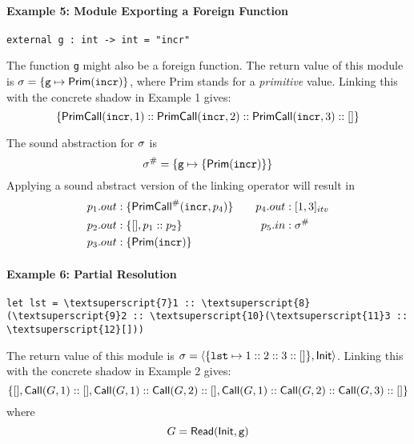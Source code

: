\documentclass{article}
\begin{document}
\paragraph{Example 5: Module Exporting a Foreign Function}
\begin{center}
  \begin{BVerbatim}
external g : int -> int = "incr"
  \end{BVerbatim}
\end{center}
The function \texttt{g} might also be a foreign function.
The return value of this module is
$\sigma=\{\texttt{g}\mapsto\textsf{Prim}(\texttt{incr})\}$,
where \textsf{Prim} stands for a \emph{primitive} value.
Linking this with the concrete shadow in Example 1 gives:
\[\{\textsf{PrimCall}(\texttt{incr},1)::\textsf{PrimCall}(\texttt{incr},2)::\textsf{PrimCall}(\texttt{incr},3)::[]\}\]

The sound abstraction for $\sigma$ is
\[
  {\sigma}^{\#}=\{\texttt{g}\mapsto\{\textsf{Prim}(\texttt{incr})\}\}
\]
Applying a sound abstract version of the linking operator will result in
\begin{align*}
  p_1.{out} & :\{{\textsf{PrimCall}}^{\#}(\texttt{incr},p_4)\} &  &  & p_4.{out} & :[1,3]_{{itv}} \\
  p_2.{out} & :\{[],p_1:: p_2\}                      &  &  & p_5.{in}  & :{\sigma}^{\#}               \\
  p_3.{out} & :\{\textsf{Prim}(\texttt{incr})\}
\end{align*}

\paragraph{Example 6: Partial Resolution}
\begin{center}
  \begin{BVerbatim}[commandchars=\\\{\}]
let lst = \textsuperscript{7}1 :: \textsuperscript{8}(\textsuperscript{9}2 :: \textsuperscript{10}(\textsuperscript{11}3 :: \textsuperscript{12}[]))
  \end{BVerbatim}
\end{center}
The return value of this module is
$\sigma=\langle\{\texttt{lst}\mapsto 1::2::3::[]\},\mathsf{Init}\rangle$.
Linking this with the concrete shadow in Example 2 gives:
\[
  \{[],\mathsf{Call}({G},1)::[],\mathsf{Call}({G},1)::\mathsf{Call}({G},2)::[],
  \mathsf{Call}({G},1)::\mathsf{Call}({G},2)::\mathsf{Call}({G},3)::[]\}
\]
where
\[
  {G}=\mathsf{Read}(\mathsf{Init},\texttt{g})
\]
\end{document}

